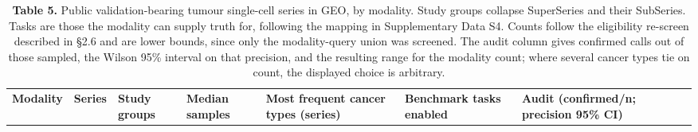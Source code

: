 \documentclass[11pt]{article}
\newenvironment{tablefont}{\par\scriptsize\setlength{\tabcolsep}{3.5pt}}{\par}
\newcommand{\thead}[1]{\textbf{#1}}
\begin{document}
\begin{tablefont}

\begin{longtable}[l]{@{}
  >{\raggedright\arraybackslash}p{}
  >{\raggedright\arraybackslash}p{}
  >{\raggedright\arraybackslash}p{}
  >{\raggedright\arraybackslash}p{}
  >{\raggedright\arraybackslash}p{}
  >{\raggedright\arraybackslash}p{}
  >{\raggedright\arraybackslash}p{}
  >{\raggedright\arraybackslash}p{}@{}}
\caption{\textbf{Table 5.} Public validation-bearing tumour single-cell series in
GEO, by modality. Study groups collapse SuperSeries and their SubSeries.
Tasks are those the modality can supply truth for, following the mapping
in Supplementary Data S4. Counts follow the eligibility re-screen
described in §2.6 and are lower bounds, since only the modality-query
union was screened. The audit column gives confirmed calls out of those
sampled, the Wilson 95\% interval on that precision, and the resulting
range for the modality count; where several cancer types tie on count,
the displayed choice is arbitrary.}\tabularnewline
\toprule
\begin{minipage}[b]{\linewidth}\raggedright
\thead{Modality}
\end{minipage} & \begin{minipage}[b]{\linewidth}\raggedright
\thead{Series}
\end{minipage} & \begin{minipage}[b]{\linewidth}\raggedright
\thead{Study groups}
\end{minipage} & \begin{minipage}[b]{\linewidth}\raggedright
\thead{Median samples}
\end{minipage} & \begin{minipage}[b]{\linewidth}\raggedright
\thead{Most frequent cancer types (series)}
\end{minipage} & \begin{minipage}[b]{\linewidth}\raggedright
\thead{Benchmark tasks enabled}
\end{minipage} & \begin{minipage}[b]{\linewidth}\raggedright
\thead{Audit (confirmed/n; precision 95\% CI)}
\end{minipage} & \begin{minipage}[b]{\linewidth}\raggedright

\end{minipage}
\end{longtable}
\end{tablefont}
\end{document}
